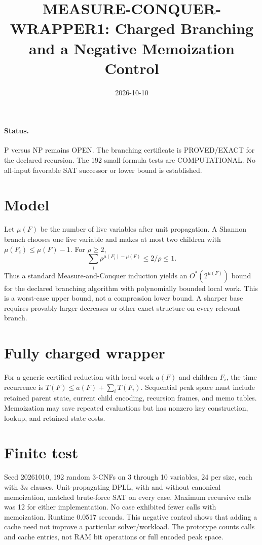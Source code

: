 \documentclass{article}
\begin{document}
\title{MEASURE-CONQUER-WRAPPER1: Charged Branching and a Negative Memoization Control}
\date{2026-10-10}\maketitle
\paragraph{Status.} P versus NP remains OPEN. The branching certificate is PROVED/EXACT for the declared recursion. The 192 small-formula tests are COMPUTATIONAL. No all-input favorable SAT successor or lower bound is established.
\section*{Model}
Let $\mu(F)$ be the number of live variables after unit propagation. A Shannon branch chooses one live variable and makes at most two children with $\mu(F_i)\le\mu(F)-1$. For $\rho\ge2$,
\[
\sum_i \rho^{\mu(F_i)-\mu(F)}\le 2/\rho\le1.
\]
Thus a standard Measure-and-Conquer induction yields an $O^*(2^{\mu(F)})$ bound for the declared branching algorithm with polynomially bounded local work. This is a worst-case upper bound, not a compression lower bound. A sharper base requires provably larger decreases or other exact structure on every relevant branch.
\section*{Fully charged wrapper}
For a generic certified reduction with local work $a(F)$ and children $F_i$, the time recurrence is $T(F)\le a(F)+\sum_iT(F_i)$. Sequential peak space must include retained parent state, current child encoding, recursion frames, and memo tables. Memoization may save repeated evaluations but has nonzero key construction, lookup, and retained-state costs.
\section*{Finite test}
Seed 20261010, 192 random 3-CNFs on 3 through 10 variables, 24 per size, each with $3n$ clauses. Unit-propagating DPLL, with and without canonical memoization, matched brute-force SAT on every case. Maximum recursive calls was 12 for either implementation. No case exhibited fewer calls with memoization. Runtime 0.0517 seconds. This negative control shows that adding a cache need not improve a particular solver/workload. The prototype counts calls and cache entries, not RAM bit operations or full encoded peak space.
\end{document}
